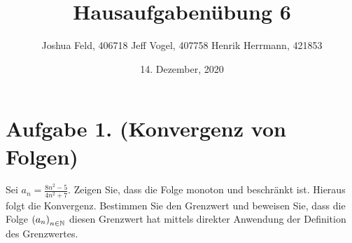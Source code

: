 \documentclass[german,12pt]{homework}
\title{Hausaufgabenübung 6}
\author{Joshua Feld, 406718 \quad Jeff Vogel, 407758 \quad Henrik Herrmann, 421853}
\date{14. Dezember, 2020}
\institute{RWTH Aachen University\\Center for Computational Engineering Science}
\newcommand{\NN}{\mathbb{N}}
\DeclarePairedDelimiter{\enbrace}{(}{)}
\begin{document}
    \maketitle

    \section*{Aufgabe 1. (Konvergenz von Folgen)}

    \begin{problem}
        Sei \(a_n = \frac{8n^2 - 5}{4n^2 + 7}\). Zeigen Sie, dass die Folge monoton und beschränkt ist. Hieraus folgt die Konvergenz. Bestimmen Sie den Grenzwert und beweisen Sie, dass die Folge \(\enbrace*{a_n}_{n \in \NN}\) diesen Grenzwert hat mittels direkter Anwendung der Definition des Grenzwertes.
    \end{problem}
\end{document}
